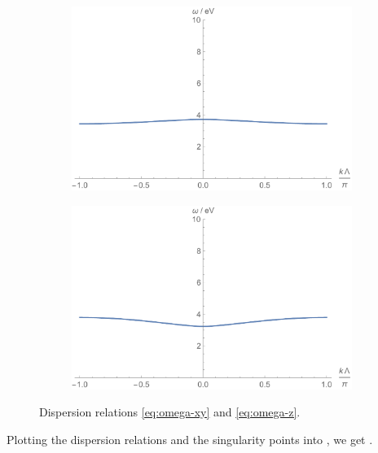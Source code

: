 \documentclass[hyperref, a4paper]{article}
\begin{document}
\begin{figure}
    \centering
    \begin{subfigure}{0.45\textwidth}
        \includegraphics[width=\textwidth]{omegaxy.pdf}
    \end{subfigure}
    \begin{subfigure}{0.45\textwidth}
        \includegraphics[width=\textwidth]{omegaz.pdf}
    \end{subfigure}
    \caption{Dispersion relations \eqref{eq:omega-xy} and \eqref{eq:omega-z}.}
    \label{fig:omega}
\end{figure}

Plotting the dispersion relations and the singularity points into , we get 
.
\end{document}
